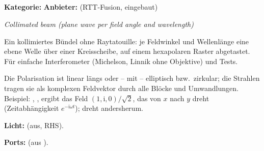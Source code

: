 \subsection{}\label{sec:block-optics-collimated-source}

\textbf{Kategorie:}  \quad \textbf{Anbieter:}  (RTT-Fusion, eingebaut)

\textit{Collimated beam (plane wave per field angle and wavelength)}

Ein kollimiertes Bündel ohne Raytatouille: je Feldwinkel und Wellenlänge eine ebene Welle über
einer Kreisscheibe, auf einem hexapolaren Raster abgetastet. Für einfache Interferometer
(Michelson, Linnik ohne Objektive) und Tests.

Die Polarisation ist linear längs  oder – mit  – elliptisch
bzw.\ zirkular; die Strahlen tragen sie als komplexen Feldvektor durch alle Blöcke und
Umwandlungen. Beispiel:  ,  ,
  ergibt das Feld $(1, \mathrm{i}, 0)/\sqrt 2$, das von $x$ nach
$y$ dreht (Zeitabhängigkeit $e^{-\mathrm{i}\omega t}$);  dreht andersherum.

\textbf{Licht:}  (aus, RHS).

\textbf{Ports:}  (aus ).

